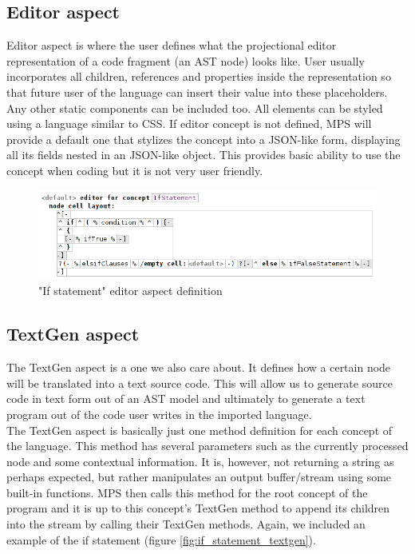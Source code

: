 \subsection{Editor aspect}
\label{chap:about_editor_aspect}

Editor aspect is where the user defines what the projectional editor representation of a code fragment (an AST node) looks like.
User usually incorporates all children, references and properties inside the representation so that future user of the language can insert their value into these placeholders.
Any other static components can be included too.
All elements can be styled using a language similar to CSS.
If editor concept is not defined, MPS will provide a default one that stylizes the concept into a JSON-like form, displaying all its fields nested in an JSON-like object.
This provides basic ability to use the concept when coding but it is not very user friendly.

\begin{figure}[h]
	\centering
	\includegraphics[width=\textwidth]{./img/if_statement_editor_definition.png}
	\caption{"If statement" editor aspect definition}
	\label{fig:if_editor_definition}
\end{figure}

\subsection{TextGen aspect}
The TextGen aspect is a one we also care about.
It defines how a certain node will be translated into a text source code.
This will allow us to generate source code in text form out of an AST model and ultimately to generate a text program out of the code user writes in the imported language.
\\

The TextGen aspect is basically just one method definition for each concept of the language.
This method has several parameters such as the currently processed node and some contextual information.
It is, however, not returning a string as perhaps expected, but rather manipulates an output buffer/stream using some built-in functions.
MPS then calls this method for the root concept of the program and it is up to this concept's TextGen method to append its children into the stream by calling their TextGen methods.
Again, we included an example of the if statement (figure \ref{fig:if_statement_textgen}).

